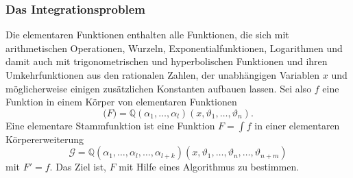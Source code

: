 \subsubsection{Das Integrationsproblem}
Die elementaren Funktionen enthalten alle Funktionen, die sich mit
arithmetischen Operationen, Wurzeln, Exponentialfunktionen, Logarithmen und
damit auch mit trigonometrischen und hyperbolischen Funktionen und ihren
Umkehrfunktionen aus den rationalen Zahlen, der unabhängigen Variablen $x$ 
und möglicherweise einigen zusätzlichen Konstanten aufbauen lassen.
Sei also $f$ eine Funktion in einem Körper von elementaren
Funktionen
\[
\mathscr(F)
=
\mathbb{Q}(\alpha_1,\dots,\alpha_l)(x,\vartheta_1,\dots,\vartheta_n).
\]
Eine elementare Stammfunktion ist eine Funktion $F=\int f$ in einer
elementaren Körpererweiterung
\[
\mathscr{G}
=
\mathbb{Q}(\alpha_1,\dots,\alpha_l,\dots,\alpha_{l+k})
(x,\vartheta_1,\dots,\vartheta_n,\dots,\vartheta_{n+m})
\]
mit $F'=f$.
Das Ziel ist, $F$ mit Hilfe eines Algorithmus zu bestimmen.



